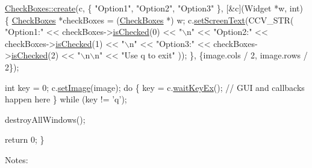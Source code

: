 \begin{DoxyCode}
    \hyperlink{classcanvascv_1_1CheckBoxes_a5108f52385a5cb19ad7fe52a18a91df0}{CheckBoxes::create}(c, \{
                           \textcolor{stringliteral}{"Option1"},
                           \textcolor{stringliteral}{"Option2"},
                           \textcolor{stringliteral}{"Option3"}
                       \},
                       [&c](Widget *w, int)
    \{
        \hyperlink{classcanvascv_1_1CheckBoxes}{CheckBoxes} *checkBoxes = (\hyperlink{classcanvascv_1_1CheckBoxes}{CheckBoxes} *) w;
        c.\hyperlink{classcanvascv_1_1Canvas_aaedea276b82a8a4cfc0895ae81113cfd}{setScreenText}(CCV\_STR(
                            \textcolor{stringliteral}{"Option1:"} <<  checkBoxes->\hyperlink{classcanvascv_1_1CheckBoxes_a2e544c7f81248c6b297460be5852506e}{isChecked}(0) << \textcolor{stringliteral}{"\(\backslash\)n"} <<
                            \textcolor{stringliteral}{"Option2:"} <<  checkBoxes->\hyperlink{classcanvascv_1_1CheckBoxes_a2e544c7f81248c6b297460be5852506e}{isChecked}(1) << \textcolor{stringliteral}{"\(\backslash\)n"} <<
                            \textcolor{stringliteral}{"Option3:"} <<  checkBoxes->\hyperlink{classcanvascv_1_1CheckBoxes_a2e544c7f81248c6b297460be5852506e}{isChecked}(2) << \textcolor{stringliteral}{"\(\backslash\)n\(\backslash\)n"} <<
                            \textcolor{stringliteral}{"Use q to exit"}
                            ));
    \},
    \{image.cols / 2, image.rows / 2\});

    \textcolor{keywordtype}{int} key = 0;
    c.\hyperlink{classcanvascv_1_1Canvas_a441c5882c7ebebd454a306b3c3478ae7}{setImage}(image);
    \textcolor{keywordflow}{do}
    \{
        key = c.\hyperlink{classcanvascv_1_1Canvas_a59397db05f5d9e45264f626f6a2ae528}{waitKeyEx}(); \textcolor{comment}{// GUI and callbacks happen here}
    \} \textcolor{keywordflow}{while} (key != \textcolor{charliteral}{'q'});

    destroyAllWindows();

    \textcolor{keywordflow}{return} 0;
\}
\end{DoxyCode}
 Notes\+:
